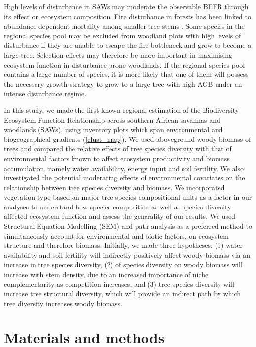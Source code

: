 \documentclass[11pt,a4paper]{article}
\begin{document}
High levels of disturbance in SAWs may moderate the observable BEFR through its effect on ecosystem composition. Fire disturbance in forests has been linked to abundance dependent mortality among smaller tree stems \citep{Roques2001, Staver2009, Bond2005}. Some species in the regional species pool may be excluded from woodland plots with high levels of disturbance if they are unable to escape the fire bottleneck and grow to become a large tree. Selection effects may therefore be more important in maximising ecosystem function in disturbance prone woodlands. If the regional species pool contains a large number of species, it is more likely that one of them will possess the necessary growth strategy to grow to a large tree with high AGB under an intense disturbance regime. 

In this study, we made the first known regional estimation of the Biodiversity-Ecosystem Function Relationship across southern African savannas and woodlands (SAWs), using inventory plots which span environmental and biogeographical gradients (\autoref{clust_map}). We used aboveground woody biomass of trees and compared the relative effects of tree species diversity with that of environmental factors known to affect ecosystem productivity and biomass accumulation, namely water availability, energy input and soil fertility. We also investigated the potential moderating effects of environmental covariates on the relationship between tree species diversity and biomass. We incorporated vegetation type based on major tree species compositional units as a factor in our analyses to understand how species composition as well as species diversity affected ecosystem function and assess the generality of our results. We used Structural Equation Modelling (SEM) and path analysis as a preferred method to simultaneously account for environmental and biotic factors,  on ecosystem structure and therefore biomass. Initially, we made three hypotheses: (1) water availability and soil fertility will indirectly positively affect woody biomass via an increase in tree species diversity, (2)  of species diversity on woody biomass will increase with stem density, due to an increased importance of niche complementarity as competition increases, and (3) tree species diversity will increase tree structural diversity, which will provide an indirect path by which tree diversity increases woody biomass.

\section*{Materials and methods}
\end{document}

